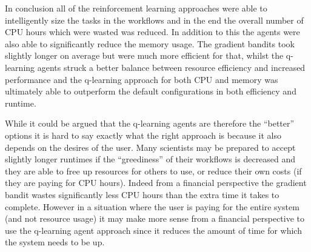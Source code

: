 In conclusion all of the reinforcement learning approaches were able to intelligently size the tasks in the workflows and in the end the overall number of CPU hours which were wasted was reduced. In addition to this the agents were also able to significantly reduce the memory usage. The gradient bandits took slightly longer on average but were much more efficient for that, whilst the q-learning agents struck a better balance between resource efficiency and increased performance and the q-learning approach for both CPU and memory was ultimately able to outperform the default configurations in both efficiency and runtime.

While it could be argued that the q-learning agents are therefore the “better” options it is hard to say exactly what the right approach is because it also depends on the desires of the user. Many scientists may be prepared to accept slightly longer runtimes if the “greediness” of their workflows is decreased and they are able to free up resources for others to use, or reduce their own costs (if they are paying for CPU hours). Indeed from a financial perspective the gradient bandit wastes significantly less CPU hours than the extra time it takes to complete. However in a situation where the user is paying for the entire system (and not resource usage) it may make more sense from a financial perspective to use the q-learning agent approach since it reduces the amount of time for which the system needs to be up.
